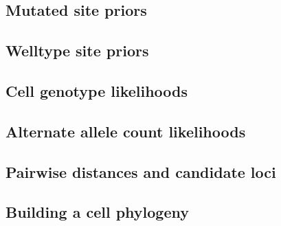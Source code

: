 \documentclass[../main.tex]{subfiles}
\begin{document}


%

\subsection{Mutated site priors}


\subsection{Welltype site priors}


\subsection{Cell genotype likelihoods}


\subsection{Alternate allele count likelihoods}


\subsection{Pairwise distances and candidate loci}


\subsection{Building a cell phylogeny}


\end{document}
